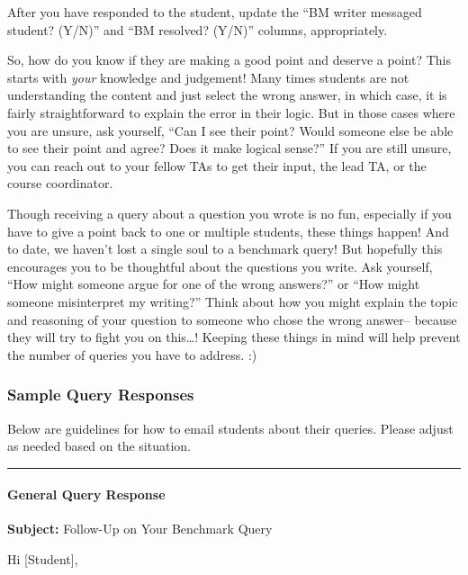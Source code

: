 \documentclass[
]{article}
\begin{document}
After you have responded to the student, update the ``BM writer messaged student? (Y/N)'' and ``BM resolved? (Y/N)'' columns, appropriately.

So, how do you know if they are making a good point and deserve a point? This starts with \emph{your} knowledge and judgement! Many times students are not understanding the content and just select the wrong answer, in which case, it is fairly straightforward to explain the error in their logic. But in those cases where you are unsure, ask yourself, ``Can I see their point? Would someone else be able to see their point and agree? Does it make logical sense?'' If you are still unsure, you can reach out to your fellow TAs to get their input, the lead TA, or the course coordinator.

Though receiving a query about a question you wrote is no fun, especially if you have to give a point back to one or multiple students, these things happen! And to date, we haven't lost a single soul to a benchmark query! But hopefully this encourages you to be thoughtful about the questions you write. Ask yourself, ``How might someone argue for one of the wrong answers?'' or ``How might someone misinterpret my writing?'' Think about how you might explain the topic and reasoning of your question to someone who chose the wrong answer-- because they will try to fight you on this\ldots! Keeping these things in mind will help prevent the number of queries you have to address. :)

\hypertarget{sample-query-responses}{%
\subsubsection{Sample Query Responses}\label{sample-query-responses}}

Below are guidelines for how to email students about their queries. Please adjust as needed based on the situation.

\begin{center}\rule{0.5\linewidth}{0.5pt}\end{center}

\hypertarget{general-query-response}{%
\paragraph{General Query Response}\label{general-query-response}}

\textbf{Subject:} Follow-Up on Your Benchmark Query

Hi {[}Student{]},
\end{document}
